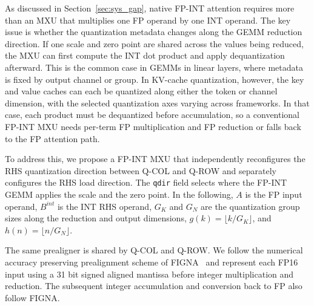 \documentclass[sigconf,anonymous,nonacm]{acmart}
\newcommand{\fpint}{FP-INT}
\newcommand{\qcol}{Q-COL}
\newcommand{\qrow}{Q-ROW}
\begin{document}
As discussed in Section~\ref{sec:sys_gap}, native \fpint{} attention requires more than an MXU that multiplies one FP operand by one INT operand. The key issue is whether the quantization metadata changes along the GEMM reduction direction. If one scale and zero point are shared across the values being reduced, the MXU can first compute the INT dot product and apply dequantization afterward. This is the common case in GEMMs in linear layers, where metadata is fixed by output channel or group. 
In KV-cache quantization, however, the key and value caches can each be quantized along either the token or channel dimension, with the selected quantization axes varying across frameworks.
In that case, each product must be dequantized before accumulation, so a conventional \fpint{} MXU needs per-term FP multiplication and FP reduction or falls back to the FP attention path.

To address this, we propose a \fpint{} MXU that independently reconfigures the RHS quantization direction between \qcol{} and \qrow{} and separately configures the RHS load direction. The \texttt{qdir} field selects where the \fpint{} GEMM applies the scale and the zero point. In the following, $A$ is the FP input operand, $B^{int}$ is the INT RHS operand, $G_K$ and $G_N$ are the quantization group sizes along the reduction and output dimensions, $g(k)=\lfloor k/G_K \rfloor$, and $h(n)=\lfloor n/G_N \rfloor$.

The same prealigner is shared by \qcol{} and \qrow{}. We follow the numerical accuracy preserving prealignment scheme of FIGNA~\cite{figna} and represent each FP16 input using a 31 bit signed aligned mantissa before integer multiplication and reduction. The subsequent integer accumulation and conversion back to FP also follow FIGNA.
\end{document}
